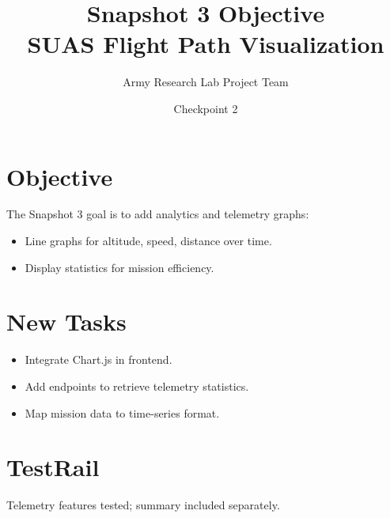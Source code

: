 \documentclass[12pt]{article}
\title{Snapshot 3 Objective\\SUAS Flight Path Visualization}
\author{Army Research Lab Project Team}
\date{Checkpoint 2}
\begin{document}
\maketitle

\section{Objective}
The Snapshot 3 goal is to add analytics and telemetry graphs:
\begin{itemize}
  \item Line graphs for altitude, speed, distance over time.
  \item Display statistics for mission efficiency.
\end{itemize}

\section{New Tasks}
\begin{itemize}
  \item Integrate Chart.js in frontend.
  \item Add endpoints to retrieve telemetry statistics.
  \item Map mission data to time-series format.
\end{itemize}

\section{TestRail}
Telemetry features tested; summary included separately.
\end{document}
